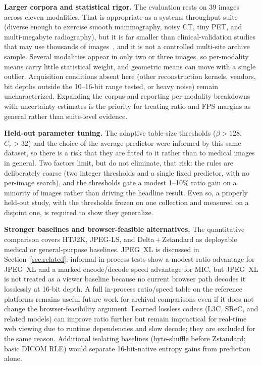 \documentclass[journal]{IEEEtran}
\begin{document}
\textbf{Larger corpora and statistical rigor.}
The evaluation rests on 39 images across eleven modalities. That is appropriate
as a systems throughput suite (diverse enough to exercise smooth mammography,
noisy CT, tiny PET, and multi-megabyte radiography), but it is far smaller than
clinical-validation studies that may use thousands of images~\cite{clunie2000},
and it is not a controlled multi-site archive sample. Several modalities appear
in only two or three images, so per-modality means carry little statistical
weight, and geometric means can move with a single outlier. Acquisition
conditions absent here (other reconstruction kernels, vendors, bit depths outside
the 10--16-bit range tested, or heavy noise) remain uncharacterized. Expanding
the corpus and reporting per-modality breakdowns with uncertainty estimates is
the priority for treating ratio and FPS margins as general rather than suite-level
evidence.

\textbf{Held-out parameter tuning.} The adaptive table-size thresholds ($\beta >
128$, $C_r > 32$) and the choice of the average predictor were informed by this
same dataset, so there is a risk that they are fitted to it rather than to
medical images in general. Two factors limit, but do not eliminate, that risk:
the rules are deliberately coarse (two integer thresholds and a single fixed
predictor, with no per-image search), and the thresholds gate a modest 1--10\%
ratio gain on a minority of images rather than driving the headline result.
Even so, a properly held-out study, with the thresholds frozen on one collection
and measured on a disjoint one, is required to show they generalize.

\textbf{Stronger baselines and browser-feasible alternatives.}
The quantitative comparison covers HTJ2K, JPEG-LS, and Delta\,+\,Zstandard as
deployable medical or general-purpose baselines. JPEG~XL is discussed in
Section~\ref{sec:related}: informal in-process tests show a modest ratio
advantage for JPEG~XL and a marked encode/decode speed advantage for MIC, but
JPEG~XL is not treated as a viewer baseline because no current browser path
decodes it losslessly at 16-bit depth. A full in-process ratio/speed table on
the reference platforms remains useful future work for archival comparisons even
if it does not change the browser-feasibility argument. Learned lossless codecs
(L3C, SReC, and related models) can improve ratio further but remain impractical
for real-time web viewing due to runtime dependencies and slow decode; they are
excluded for the same reason. Additional isolating baselines (byte-shuffle before
Zstandard; basic DICOM RLE) would separate 16-bit-native entropy gains from
prediction alone.
\end{document}

